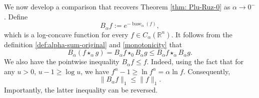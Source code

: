 \documentclass[11pt]{amsart}
\theoremstyle{plain}
\theoremstyle{definition}
\theoremstyle{remark}
\begin{document}
We now develop a comparison that recovers Theorem \ref{thm: Plu-Ruz-0} as $\alpha \to 0^-$. Define
$$
    B_\alpha f :=e^{-\operatorname{base}_\alpha(f)},
$$
which is a log-concave function for every $f\in C_\alpha(\mathbb R^n)$. It follows from the definition \eqref{def:alpha-sum-original} and \eqref{monotonicity} that
\begin{equation}
    \label{eq:03}
    B_\alpha (f\star_\alpha g) = B_\alpha f \star_0 B_\alpha g \leq B_\alpha f \star_\alpha B_\alpha g.
\end{equation}
We also have the pointwise inequality $B_\alpha f \leq f$. Indeed, using the fact that for any $u >0$, $u-1 \geq \log u$, we have
$f^\alpha-1\geq\ln f^\alpha=\alpha\ln f.$ Consequently,
\begin{equation}\label{eq:02}
    \|B_\alpha f\|_1\leq\|f\|_1.
\end{equation}
Importantly, the latter inequality can be reversed.
\end{document}
